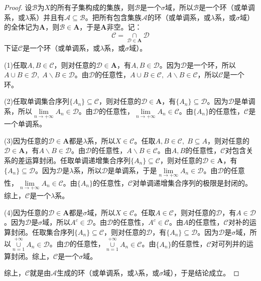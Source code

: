 \begin{proof}
	设$\mathscr{B}$为$X$的所有子集构成的集族，则$\mathscr{B}$是一个$\sigma$域，所以$\mathscr{B}$是一个环（或单调系，或$\lambda$系）并且有$\mathscr{A}\subseteq\mathscr{B}$。把所有包含集族$\mathscr{A}$的环（或单调系，或$\lambda$系，或$\sigma$域）的全体记为$\mathbf{A}$，则$\mathscr{B}\in \mathbf{A}$，于是$\mathbf{A}$非空。记：
	\begin{equation*}
		\mathscr{C}=\underset{\mathscr{D}\in \mathbf{A}}{\cap}\mathscr{D}
	\end{equation*}
	下证$\mathscr{C}$是一个环（或单调系，或$\lambda$系，或$\sigma$域）。\par
	(1)任取$A,B\in\mathscr{C}$，则对任意的$\mathscr{D}\in\mathbf{A}$，有$A,B\in\mathscr{D}$。因为$\mathscr{D}$是一个环，所以$A\cup B\in\mathscr{D},\;A\backslash B\in\mathscr{D}$。由$\mathscr{D}$的任意性，$A\cup B\in\mathscr{C},\;A\backslash B\in\mathscr{C}$，所以$\mathscr{C}$是一个环。\par
	(2)任取单调集合序列$\{A_n\}\subseteq\mathscr{C}$，则对任意的$\mathscr{D}\in\mathbf{A}$，有$\{A_n\}\subseteq\mathscr{D}$。因为$\mathscr{D}$是单调系，所以$\lim\limits_{n\to+\infty}A_n\in\mathscr{D}$。由$\mathscr{D}$的任意性，$\lim\limits_{n\to+\infty}A_n\in\mathscr{C}$。由$\{A_n\}$的任意性，$\mathscr{C}$是一个单调系。\par
	(3)因为任意的$\mathscr{D}\in\mathbf{A}$都是$\lambda$系，所以$X\in\mathscr{C}$。任取$A,B\in\mathscr{C},\;B\subseteq A$，则对任意的$\mathscr{D}\in\mathbf{A}$，有$A\backslash B\in\mathscr{D}$。由$\mathscr{D}$的任意性，$A\backslash B\in\mathscr{C}$。由$A,B$的任意性，$\mathscr{C}$对包含关系的差运算封闭。任取单调递增集合序列$\{A_n\}\subseteq\mathscr{C}$，则对任意的$\mathscr{D}\in\mathbf{A}$，有$\{A_n\}\subseteq\mathscr{D}$。因为$\mathscr{D}$是$\lambda$系，所以$\mathscr{D}$是单调系，于是$\lim\limits_{n\to+\infty}A_n\in\mathscr{D}$。由$\mathscr{D}$的任意性，$\lim\limits_{n\to+\infty}A_n\in\mathscr{C}$。由$\{A_n\}$的任意性，$\mathscr{C}$对单调递增集合序列的极限是封闭的。综上，$\mathscr{C}$是一个$\lambda$系。\par
	(4)因为任意的$\mathscr{D}\in\mathbf{A}$都是$\sigma$域，所以$X\in\mathscr{C}$。任取$A\in\mathscr{C}$，则对任意的$\mathscr{D}$，有$A\in\mathscr{D}$。因为$\mathscr{D}$是$\sigma$域，所以$A^c\in\mathscr{D}$。由$\mathscr{D}$的任意性，$A^c\in\mathscr{C}$。由$A$的任意性，$\mathscr{C}$对补的运算封闭。任取集合序列$\{A_n\}\subseteq\mathscr{C}$，则对任意的$\mathscr{D}$，有$\{A_n\}\subseteq\mathscr{D}$。因为$\mathscr{D}$是$\sigma$域，所以$\underset{n=1}{\overset{+\infty}{\cup}}A_n\in\mathscr{D}$。由$\mathscr{D}$的任意性，$\underset{n=1}{\overset{+\infty}{\cup}}A_n\in\mathscr{C}$。由$\{A_n\}$的任意性，$\mathscr{C}$对可列并的运算封闭。综上，$\mathscr{C}$是一个$\sigma$域。\par
	综上，$\mathscr{C}$就是由$\mathscr{A}$生成的环（或单调系，或$\lambda$系，或$\sigma$域），于是结论成立。
\end{proof}
